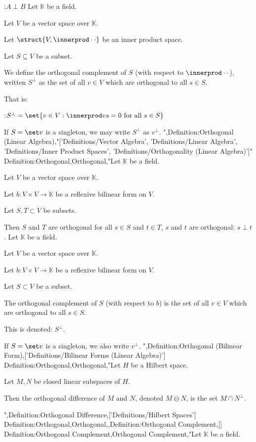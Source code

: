 :$A \perp B$
Let $\mathbb K$ be a field.

Let $V$ be a vector space over $\mathbb K$.

Let $\struct {V, \innerprod \cdot \cdot}$ be an inner product space.

Let $S\subseteq V$ be a subset.


We define the orthogonal complement of $S$ (with respect to $\innerprod \cdot \cdot$), written $S^\perp$ as the set of all $v \in V$ which are orthogonal to all $s \in S$.

That is: 

:$S^\perp = \set {v \in V : \innerprod v s = 0 \text { for all } s \in S}$


If $S = \set v$ is a singleton, we may write $S^\perp$ as $v^\perp$.
",Definition:Orthogonal (Linear Algebra),"['Definitions/Vector Algebra', 'Definitions/Linear Algebra', 'Definitions/Inner Product Spaces', 'Definitions/Orthogonality (Linear Algebra)']"
Definition:Orthogonal,Orthogonal,"Let $\mathbb K$ be a field.

Let $V$ be a vector space over $\mathbb K$.

Let $b: V \times V \to \mathbb K$ be a reflexive bilinear form on $V$.

Let $S, T \subset V$ be subsets.


Then $S$ and $T$ are orthogonal  for all $s \in S$ and $t \in T$, $s$ and $t$ are orthogonal: $s \perp t$.
Let $\mathbb K$ be a field.

Let $V$ be a vector space over $\mathbb K$.

Let $b : V\times V \to \mathbb K$ be a reflexive bilinear form on $V$.

Let $S\subset V$ be a subset.


The orthogonal complement of $S$ (with respect to $b$) is the set of all $v \in V$ which are orthogonal to all $s \in S$.


This is denoted: $S^\perp$.

If $S = \set v$ is a singleton, we also write $v^\perp$.
",Definition:Orthogonal (Bilinear Form),['Definitions/Bilinear Forms (Linear Algebra)']
Definition:Orthogonal,Orthogonal,"Let $H$ be a Hilbert space.

Let $M, N$ be closed linear subspaces of $H$.


Then the orthogonal difference of $M$ and $N$, denoted $M \ominus N$, is the set $M \cap N^\perp$.

",Definition:Orthogonal Difference,['Definitions/Hilbert Spaces']
Definition:Orthogonal,Orthogonal,,Definition:Orthogonal Complement,[]
Definition:Orthogonal Complement,Orthogonal Complement,"Let $\mathbb K$ be a field.


